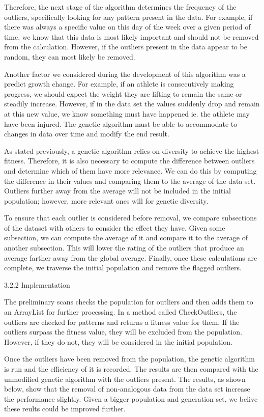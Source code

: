 \documentclass[conference]{IEEEtran}
\begin{document}
Therefore, the next stage of the algorithm determines the frequency of the outliers, specifically looking for any pattern present in the data. For example, if there was always a specific value on this day of the week over a given period of time, we know that this data is most likely important and should not be removed from the calculation. However, if the outliers present in the data appear to be random, they can most likely be removed. 

Another factor we considered during the development of this algorithm was a predict growth change. For example, if an athlete is consecutively making progress, we should expect the weight they are lifting to remain the same or steadily increase. However, if in the data set the values suddenly drop and remain at this new value, we know something must have happened ie. the athlete may have been injured. The genetic algorithm must be able to accommodate to changes in data over time and modify the end result.

As stated previously, a genetic algorithm relies on diversity to achieve the highest fitness. Therefore, it is also necessary to compute the difference between outliers and determine which of them have more relevance. We can do this by computing the difference in their values and comparing them to the average of the data set. Outliers further away from the average will not be included in the initial population; however, more relevant ones will for genetic diversity. 

To ensure that each outlier is considered before removal, we compare subsections of the dataset with others to consider the effect they have. Given some subsection, we can compute the average of it and compare it to the average of another subsection. This will lower the rating of the outliers that produce an average farther away from the global average. Finally, once these calculations are complete, we traverse the initial population and remove the flagged outliers.

3.2.2 Implementation

The preliminary scans checks the population for outliers and then adds them to an ArrayList for further processing. In a method called CheckOutliers, the outliers are checked for patterns and returns a fitness value for them. If the outliers surpass the fitness value, they will be excluded from the population. However, if they do not, they will be considered in the initial population.

Once the outliers have been removed from the population, the genetic algorithm is run and the efficiency of it is recorded. The results are then compared with the unmodified genetic algorithm with the outliers present. The results, as shown below, show that the removal of non-analogous data from the data set increase the performance slightly. Given a bigger population and generation set, we belive these reults could be improved further. 
\end{document}
